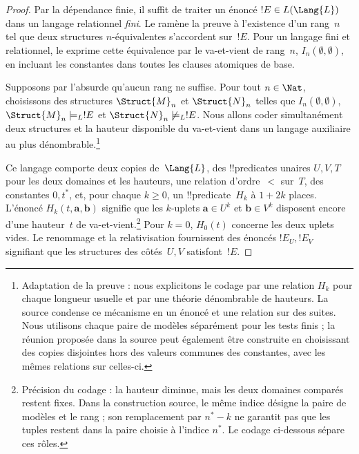 \documentclass[../../../include/open-logic-section]{subfiles}
\begin{document}
\begin{proof}
Par la dépendance finie, il
suffit de traiter un énoncé
$!E\in L(\Lang{L})$ dans un
langage relationnel \emph{fini}.
Le  ramène
la preuve à l'existence d'un
rang~$n$ tel que deux structures
$n$-équivalentes s'accordent
sur~$!E$. Pour un langage fini
et relationnel, le
exprime cette équivalence par
le va-et-vient de rang~$n$,
$I_n(\emptyset,\emptyset)$, en incluant les constantes dans toutes les clauses atomiques de base.

Supposons par l'absurde qu'aucun
rang ne suffise. Pour tout
$n\in\Nat$, choisissons des
structures $\Struct{M}_n$ et
$\Struct{N}_n$ telles que
$I_n(\emptyset,\emptyset)$,
$\Struct{M}_n\models_L !E$ et
$\Struct{N}_n\not\models_L !E$.
Nous allons coder simultanément
deux structures et la hauteur
disponible du va-et-vient dans
un langage auxiliaire au plus
dénombrable.\footnote{Adaptation de la preuve : nous explicitons le codage par une relation $H_k$ pour chaque longueur usuelle et par une théorie dénombrable de hauteurs. La source condense ce mécanisme en un énoncé et une relation sur des suites. Nous utilisons chaque paire de modèles séparément pour les tests finis ; la réunion proposée dans la source peut également être construite en choisissant des copies disjointes hors des valeurs communes des constantes, avec les mêmes relations sur celles-ci.}

Ce langage comporte deux copies
de~$\Lang{L}$, des !!{predicate}s
unaires $U,V,T$ pour les deux
domaines et les hauteurs, une
relation d'ordre~$<$ sur~$T$,
des constantes $0,t^*$, et,
pour chaque $k\geq0$, un
!!{predicate}~$H_k$ à $1+2k$
places. L'énoncé
$H_k(t,\mathbf a,\mathbf b)$
signifie que les $k$-uplets
$\mathbf a\in U^k$ et
$\mathbf b\in V^k$ disposent
encore d'une hauteur~$t$
de va-et-vient.\footnote{Précision du codage : la hauteur diminue, mais les deux domaines comparés restent fixes. Dans la construction source, le même indice désigne la paire de modèles et le rang ; son remplacement par $n^*-k$ ne garantit pas que les tuples restent dans la paire choisie à l'indice $n^*$. Le codage ci-dessous sépare ces rôles.} Pour $k=0$,
$H_0(t)$ concerne les deux
uplets vides. Le renommage et
la relativisation fournissent
des énoncés $!E_U,!E_V$
signifiant que les structures
des côtés~$U,V$ satisfont~$!E$.


\end{proof}
\end{document}

